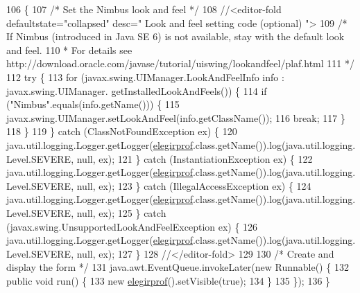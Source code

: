 \begin{DoxyCode}
106                                            \{
107         \textcolor{comment}{/* Set the Nimbus look and feel */}
108         \textcolor{comment}{//<editor-fold defaultstate="collapsed" desc=" Look and feel setting code (optional) ">}
109         \textcolor{comment}{/* If Nimbus (introduced in Java SE 6) is not available, stay with the default look and feel.}
110 \textcolor{comment}{         * For details see http://download.oracle.com/javase/tutorial/uiswing/lookandfeel/plaf.html }
111 \textcolor{comment}{         */}
112         \textcolor{keywordflow}{try} \{
113             \textcolor{keywordflow}{for} (javax.swing.UIManager.LookAndFeelInfo info : javax.swing.UIManager.
      getInstalledLookAndFeels()) \{
114                 \textcolor{keywordflow}{if} (\textcolor{stringliteral}{"Nimbus"}.equals(info.getName())) \{
115                     javax.swing.UIManager.setLookAndFeel(info.getClassName());
116                     \textcolor{keywordflow}{break};
117                 \}
118             \}
119         \} \textcolor{keywordflow}{catch} (ClassNotFoundException ex) \{
120             java.util.logging.Logger.getLogger(\mbox{\hyperlink{classsoftware_1_1elegirprof_aa313615b4f8abecfacd11e7a5a8c41f6}{elegirprof}}.class.getName()).log(java.util.logging.
      Level.SEVERE, null, ex);
121         \} \textcolor{keywordflow}{catch} (InstantiationException ex) \{
122             java.util.logging.Logger.getLogger(\mbox{\hyperlink{classsoftware_1_1elegirprof_aa313615b4f8abecfacd11e7a5a8c41f6}{elegirprof}}.class.getName()).log(java.util.logging.
      Level.SEVERE, null, ex);
123         \} \textcolor{keywordflow}{catch} (IllegalAccessException ex) \{
124             java.util.logging.Logger.getLogger(\mbox{\hyperlink{classsoftware_1_1elegirprof_aa313615b4f8abecfacd11e7a5a8c41f6}{elegirprof}}.class.getName()).log(java.util.logging.
      Level.SEVERE, null, ex);
125         \} \textcolor{keywordflow}{catch} (javax.swing.UnsupportedLookAndFeelException ex) \{
126             java.util.logging.Logger.getLogger(\mbox{\hyperlink{classsoftware_1_1elegirprof_aa313615b4f8abecfacd11e7a5a8c41f6}{elegirprof}}.class.getName()).log(java.util.logging.
      Level.SEVERE, null, ex);
127         \}
128         \textcolor{comment}{//</editor-fold>}
129 
130         \textcolor{comment}{/* Create and display the form */}
131         java.awt.EventQueue.invokeLater(\textcolor{keyword}{new} Runnable() \{
132             \textcolor{keyword}{public} \textcolor{keywordtype}{void} run() \{
133                 \textcolor{keyword}{new} \mbox{\hyperlink{classsoftware_1_1elegirprof_aa313615b4f8abecfacd11e7a5a8c41f6}{elegirprof}}().setVisible(\textcolor{keyword}{true});
134             \}
135         \});
136     \}
\end{DoxyCode}


